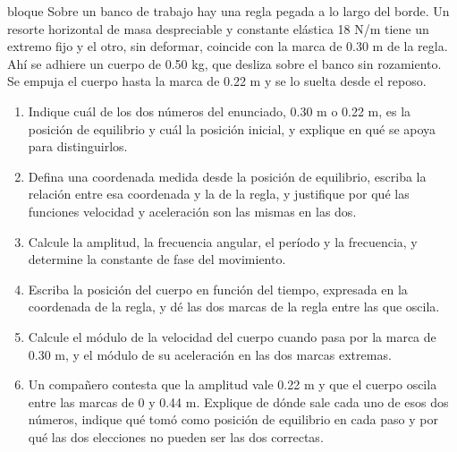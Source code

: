 \documentclass[11pt,openany]{book}
\begin{document}
\begin{ejercicio}{bloque}
Sobre un banco de trabajo hay una regla pegada a lo largo del borde. Un resorte horizontal de masa despreciable y constante elástica 18 N/m tiene un extremo fijo y el otro, sin deformar, coincide con la marca de 0.30 m de la regla. Ahí se adhiere un cuerpo de 0.50 kg, que desliza sobre el banco sin rozamiento. Se empuja el cuerpo hasta la marca de 0.22 m y se lo suelta desde el reposo.
\begin{enumerate}[label=(\alph*), leftmargin=1.7em, itemsep=1pt, topsep=3pt]
  \item Indique cuál de los dos números del enunciado, 0.30 m o 0.22 m, es la posición de equilibrio y cuál la posición inicial, y explique en qué se apoya para distinguirlos.
  \item Defina una coordenada medida desde la posición de equilibrio, escriba la relación entre esa coordenada y la de la regla, y justifique por qué las funciones velocidad y aceleración son las mismas en las dos.
  \item Calcule la amplitud, la frecuencia angular, el período y la frecuencia, y determine la constante de fase del movimiento.
  \item Escriba la posición del cuerpo en función del tiempo, expresada en la coordenada de la regla, y dé las dos marcas de la regla entre las que oscila.
  \item Calcule el módulo de la velocidad del cuerpo cuando pasa por la marca de 0.30 m, y el módulo de su aceleración en las dos marcas extremas.
  \item Un compañero contesta que la amplitud vale 0.22 m y que el cuerpo oscila entre las marcas de 0 y 0.44 m. Explique de dónde sale cada uno de esos dos números, indique qué tomó como posición de equilibrio en cada paso y por qué las dos elecciones no pueden ser las dos correctas.
\end{enumerate}
\end{ejercicio}
\end{document}

